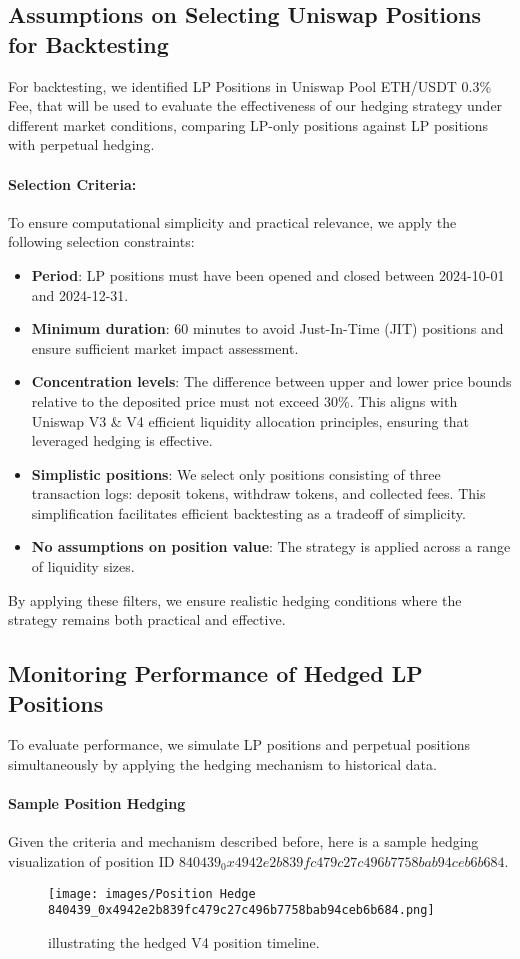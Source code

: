 \documentclass[12pt]{article}
\begin{document}
\subsection{Assumptions on Selecting Uniswap Positions for Backtesting}
For backtesting, we identified LP Positions in Uniswap Pool ETH/USDT 0.3\% Fee, that will be used to evaluate the effectiveness of our hedging strategy under different market conditions, comparing LP-only positions against LP positions with perpetual hedging.

\paragraph{Selection Criteria:}
To ensure computational simplicity and practical relevance, we apply the following selection constraints:
\begin{itemize}
	\item \textbf{Period}: LP positions must have been opened and closed between 2024-10-01 and 2024-12-31.
	\item \textbf{Minimum duration}: 60 minutes to avoid Just-In-Time (JIT) positions and ensure sufficient market impact assessment.
	\item \textbf{Concentration levels}: The difference between upper and lower price bounds relative to the deposited price must not exceed 30\%. This aligns with Uniswap V3 \& V4 efficient liquidity allocation principles, ensuring that leveraged hedging is effective.
	\item \textbf{Simplistic positions}: We select only positions consisting of three transaction logs: deposit tokens, withdraw tokens, and collected fees. This simplification facilitates efficient backtesting as a tradeoff of simplicity.
	\item \textbf{No assumptions on position value}: The strategy is applied across a range of liquidity sizes.
\end{itemize}
By applying these filters, we ensure realistic hedging conditions where the strategy remains both practical and effective.

\subsection{Monitoring Performance of Hedged LP Positions}
To evaluate performance, we simulate LP positions and perpetual positions simultaneously by applying the hedging mechanism to historical data.

\paragraph{Sample Position Hedging}
Given the criteria and mechanism described before, here is a sample hedging visualization of position ID \textbf{$840439_0x4942e2b839fc479c27c496b7758bab94ceb6b684$}.
\begin{figure}[htb]
	\centering
	\texttt{[image: images/Position Hedge 840439\_0x4942e2b839fc479c27c496b7758bab94ceb6b684.png]}
	\caption{illustrating the hedged V4 position timeline.}
	\label{fig:Sample}
\end{figure}
\end{document}
